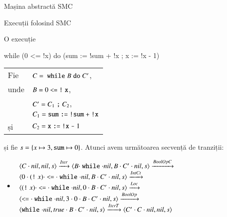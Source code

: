 \documentclass[handout,xcolor=pdftex,romanian,colorlinks]{beamer}
\begin{document}
\begin{section}{Mașina abstractă SMC}
\begin{subsection}{Execuții folosind SMC}
\begin{frame}[fragile]{O execuție}
\begin{minipage}{.35\columnwidth}
\begin{asciic}
 while (0 <= !x)  do
   (sum := !sum + !x ;
    x := !x - 1)
\end{asciic}
\end{minipage}
\hfill
\begin{minipage}{.63\columnwidth}
\begin{tabular}{ll}Fie& $C = {} \Swhile B \Sdo C'$,\\ unde &$B = 0 \terminal{<=} {\terminal{!} {\terminal{x}}}$,\\&$C' = C_1 \terminal{;} C_2$,\\ &$C_1 = {\terminal{sum}} \terminal{:=} {\terminal{!} \terminal{sum}} \terminal{+} {\terminal{!} \terminal{x}}$\\\hfill și & $C_2 =
{\terminal{x}} \terminal{:=} {\terminal{!} \terminal{x}} \terminal{-} 1 $
\end{tabular}
\end{minipage}
și fie $s = \{ x \mapsto 3, {\terminal{sum}} \mapsto 0\}$.  Atunci avem următoarea secvență de tranziții:
\begin{itemize}
\item[] 
$\begin{array}{l}\c{C\cdot \Snil, \Snil, s} \xrightarrow{Iter} \c{B\cdot \Swhile \cdot \Snil,  B\cdot C' \cdot \Snil, s} \xrightarrow{BoolOpC}
\\
 \c{0 \cdot (\terminal{!} x) \cdot \terminal{<=}\cdot \Swhile \cdot \Snil,  B\cdot C' \cdot \Snil, s} \xrightarrow{IntCt}
\\ 
\c{(\terminal{!} x) \cdot \terminal{<=}\cdot \Swhile \cdot \Snil,  0 \cdot B\cdot C' \cdot \Snil, s}  \xrightarrow{Loc}
\\  
\c{\terminal{<=}\cdot \Swhile \cdot \Snil,  3\cdot 0 \cdot B\cdot C' \cdot \Snil, s}
\xrightarrow{BoolOp}
\\  
\c{\Swhile \cdot \Snil,  \Strue \cdot B\cdot C' \cdot \Snil, s} 
 \xrightarrow{IterT}  \c{C' \cdot C \cdot \Snil,  \Snil, s} 
\end{array}$
\end{itemize}
\end{frame}


\end{subsection}
\end{section}
\end{document}
